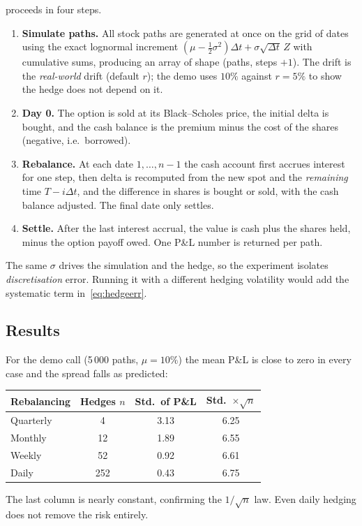 \documentclass[11pt,a4paper]{article}
\newcommand{\fn}[1]{\texttt{\detokenize{#1}}}   %
\theoremstyle{plain}
\theoremstyle{remark}
\begin{document}
\begin{codenote}
\fn{delta_hedge_pnl} proceeds in four steps.
\begin{enumerate}[nosep,leftmargin=*]
\item \textbf{Simulate paths.} All \fn{n_paths} stock paths are generated at once on the grid of \fn{n_steps} dates using the exact lognormal
  increment $(\mu-\tfrac12\sigma^2)\Delta t+\sigma\sqrt{\Delta t}\,Z$ with cumulative sums, producing an array of shape (paths, steps $+1$).
  The drift \fn{mu} is the \emph{real-world} drift (default $r$); the demo uses $10\%$ against $r=5\%$ to show the hedge does not depend on it.
\item \textbf{Day 0.} The option is sold at its Black--Scholes price, the initial delta is bought, and the cash balance is the
  premium minus the cost of the shares (negative, i.e.\ borrowed).
\item \textbf{Rebalance.} At each date $1,\dots,n-1$ the cash account first accrues interest for one step, then delta is recomputed from the new
  spot and the \emph{remaining} time $T-i\Delta t$, and the difference in shares is bought or sold, with the cash balance adjusted.
  The final date only settles.
\item \textbf{Settle.} After the last interest accrual, the value is cash plus the shares held, minus the option payoff owed. One P\&L number is
  returned per path.
\end{enumerate}
The same $\sigma$ drives the simulation and the hedge, so the experiment isolates \emph{discretisation} error. Running it with a different hedging
volatility would add the systematic term in~\eqref{eq:hedgeerr}.
\end{codenote}

\subsection{Results}

For the demo call (5\,000 paths, $\mu=10\%$) the mean P\&L is close to zero in every case and the spread falls as predicted:

\begin{center}
\renewcommand{\arraystretch}{1.2}
\begin{tabular}{@{}lccc@{}}
\toprule
Rebalancing & Hedges $n$ & Std.\ of P\&L & Std.\ $\times\sqrt n$ \\
\midrule
Quarterly & 4 & 3.13 & 6.25 \\
Monthly & 12 & 1.89 & 6.55 \\
Weekly & 52 & 0.92 & 6.61 \\
Daily & 252 & 0.43 & 6.75 \\
\bottomrule
\end{tabular}
\end{center}
The last column is nearly constant, confirming the $1/\sqrt n$ law. Even daily hedging does not remove the risk entirely.
\end{document}
